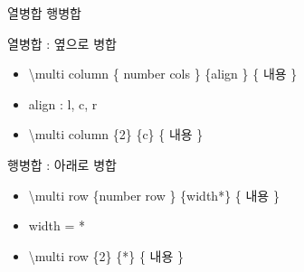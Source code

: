 \documentclass[ aspectratio=149,  14pt,blue,xcolor=pdftex,dvipsnames,table,handout,notes]{beamer}
\begin{document}
		\begin{frame}[t]{열병합 행병합}

		\begin{block}{열병합 : 옆으로 병합}
		\begin{itemize}
		\item[]	\textbackslash multi column \{ number cols \} \{align \} \{ 내용 \}
		\item	align : l, c, r
		\end{itemize}
		\end{block}


		\begin{example}
		\begin{itemize}
		\item[]	\textbackslash multi column \{2\} \{c\} \{ 내용 \}
		\end{itemize}
		\end{example}

		\begin{block}{행병합 : 아래로 병합}
		\begin{itemize}
		\item[]	\textbackslash multi row \{number row \} \{width*\} \{ 내용 \}
		\item    width = *
		\end{itemize}
		\end{block}

		\begin{example}
		\begin{itemize}
		\item[]	\textbackslash multi row \{2\} \{*\} \{ 내용 \}
		\end{itemize}
		\end{example}

		
		\end{frame}
\end{document}
